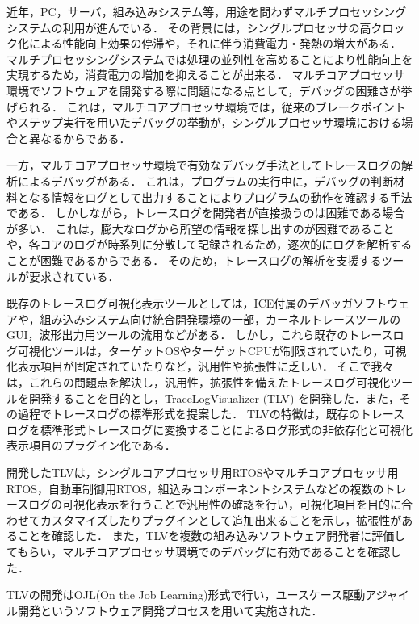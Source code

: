 近年，PC，サーバ，組み込みシステム等，用途を問わずマルチプロセッシングシステムの利用が進んでいる．
その背景には，シングルプロセッサの高クロック化による性能向上効果の停滞や，それに伴う消費電力・発熱の増大がある．
マルチプロセッシングシステムでは処理の並列性を高めることにより性能向上を実現するため，消費電力の増加を抑えることが出来る．
マルチコアプロセッサ環境でソフトウェアを開発する際に問題になる点として，デバッグの困難さが挙げられる．
これは，マルチコアプロセッサ環境では，従来のブレークポイントやステップ実行を用いたデバッグの挙動が，シングルプロセッサ環境における場合と異なるからである．

一方，マルチコアプロセッサ環境で有効なデバッグ手法としてトレースログの解析によるデバッグがある．
これは，プログラムの実行中に，デバッグの判断材料となる情報をログとして出力することによりプログラムの動作を確認する手法である．
しかしながら，トレースログを開発者が直接扱うのは困難である場合が多い．
これは，膨大なログから所望の情報を探し出すのが困難であることや，各コアのログが時系列に分散して記録されるため，逐次的にログを解析することが困難であるからである．
そのため，トレースログの解析を支援するツールが要求されている．

既存のトレースログ可視化表示ツールとしては，ICE付属のデバッガソフトウェアや，組み込みシステム向け統合開発環境の一部，カーネルトレースツールのGUI，波形出力用ツールの流用などがある．
しかし，これら既存のトレースログ可視化ツールは，ターゲットOSやターゲットCPUが制限されていたり，可視化表示項目が固定されていたりなど，汎用性や拡張性に乏しい．
そこで我々は，これらの問題点を解決し，汎用性，拡張性を備えたトレースログ可視化ツールを開発することを目的とし，TraceLogVisualizer (TLV) を開発した．また，その過程でトレースログの標準形式を提案した．
TLVの特徴は，既存のトレースログを標準形式トレースログに変換することによるログ形式の非依存化と可視化表示項目のプラグイン化である．

開発したTLVは，シングルコアプロセッサ用RTOSやマルチコアプロセッサ用RTOS，自動車制御用RTOS，組込みコンポーネントシステムなどの複数のトレースログの可視化表示を行うことで汎用性の確認を行い，可視化項目を目的に合わせてカスタマイズしたりプラグインとして追加出来ることを示し，拡張性があることを確認した．
また，TLVを複数の組み込みソフトウェア開発者に評価してもらい，マルチコアプロセッサ環境でのデバッグに有効であることを確認した．

TLVの開発はOJL(On the Job Learning)形式で行い，ユースケース駆動アジャイル開発というソフトウェア開発プロセスを用いて実施された．
